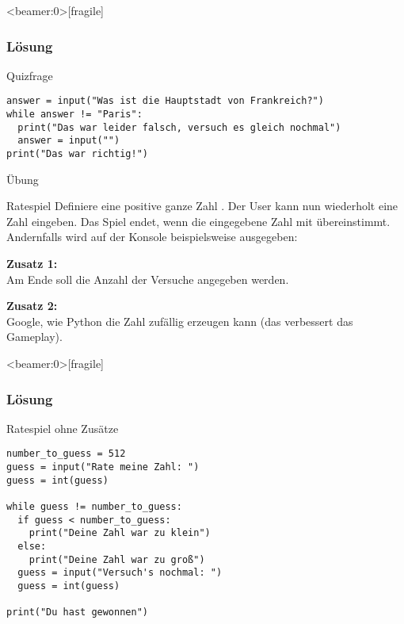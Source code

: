 \begin{frame}<beamer:0>[fragile]
\frametitle{Lösung}
\begin{solutionblock}{Quizfrage}
\begin{verbatim}
answer = input("Was ist die Hauptstadt von Frankreich?")
while answer != "Paris": 
  print("Das war leider falsch, versuch es gleich nochmal")
  answer = input("")
print("Das war richtig!")
\end{verbatim}
\end{solutionblock}
\end{frame}


\begin{frame}{Übung}

\begin{block}{Ratespiel}
\vspace{2pt}
Definiere eine positive ganze Zahl . Der User kann nun wiederholt eine Zahl eingeben. Das Spiel endet, wenn die eingegebene Zahl mit  übereinstimmt. 
Andernfalls wird auf der Konsole beispielsweise ausgegeben: 


\pause
\textbf{Zusatz 1:} \\
Am Ende soll die Anzahl der Versuche angegeben werden.


\pause
\textbf{Zusatz 2:} \\
Google, wie Python die Zahl  zufällig erzeugen kann (das verbessert das Gameplay).  

\end{block}
\end{frame}



\begin{frame}<beamer:0>[fragile]
\frametitle{Lösung}
\begin{solutionblock}{Ratespiel ohne Zusätze}
\begin{verbatim}
number_to_guess = 512
guess = input("Rate meine Zahl: ")
guess = int(guess)

while guess != number_to_guess:
  if guess < number_to_guess:
    print("Deine Zahl war zu klein")
  else:
    print("Deine Zahl war zu groß")
  guess = input("Versuch's nochmal: ")
  guess = int(guess)

print("Du hast gewonnen")
\end{verbatim}
\end{solutionblock}
\end{frame}


